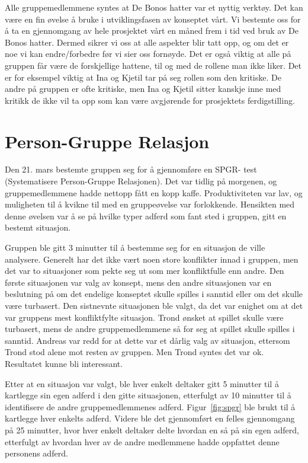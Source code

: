 Alle gruppemedlemmene syntes at De Bonos hatter var et nyttig verktøy. Det kan være en fin øvelse å bruke i utviklingsfasen av konseptet vårt. Vi bestemte oss for å ta en gjennomgang av hele prosjektet vårt en måned frem i tid ved bruk av De Bonos hatter. Dermed sikrer vi oss at alle aspekter blir tatt opp, og om det er noe vi kan endre/forbedre før vi sier oss fornøyde. Det er også viktig at alle på gruppen får være de forskjellige hattene, til og med de rollene man ikke liker. Det er for eksempel viktig at Ina og Kjetil tar på seg rollen som den kritiske. De andre på gruppen er ofte kritiske, men Ina og Kjetil sitter kanskje inne med kritikk de ikke vil ta opp som kan være avgjørende for prosjektets ferdigstilling. 


\section{Person-Gruppe Relasjon} %
Den 21. mars bestemte gruppen seg for å gjennomføre en SPGR- test (Systematisere Person-Gruppe Relasjonen). Det var tidlig på morgenen, og gruppemedlemmene hadde nettopp fått en kopp kaffe. Produktiviteten var lav, og muligheten til å kvikne til med en gruppeøvelse var forlokkende. Hensikten med denne øvelsen var å se på hvilke typer adferd som fant sted i gruppen, gitt en bestemt situasjon. 

Gruppen ble gitt 3 minutter til å bestemme seg for en situasjon de ville analysere. Generelt har det ikke vært noen store konflikter innad i gruppen, men det var to situasjoner som pekte seg ut som mer konfliktfulle enn andre. Den første situasjonen var valg av konsept, mens den andre situasjonen var en beslutning på om det endelige konseptet skulle spilles i sanntid eller om det skulle være turbasert. Den sistnevnte situasjonen ble valgt, da det var enighet om at det var gruppens mest konfliktfylte situasjon. Trond ønsket at spillet skulle være turbasert, mens de andre gruppemedlemmene så for seg at spillet skulle spilles i sanntid. Andreas var redd for at dette var et dårlig valg av situasjon, ettersom Trond stod alene mot resten av gruppen. Men Trond syntes det var ok. Resultatet kunne bli interessant.

Etter at en situasjon var valgt, ble hver enkelt deltaker gitt 5
minutter til å kartlegge sin egen adferd i den gitte situasjonen,
etterfulgt av 10 minutter til å identifisere de andre gruppemedlemmenes
adferd. Figur~\ref{fig:spgr} ble brukt til å kartlegge hver enkelts
adferd. Videre ble det gjennomført en felles gjennomgang på 25 minutter,
hvor hver enkelt deltaker delte hvordan en så på sin egen adferd,
etterfulgt av hvordan hver av de andre medlemmene hadde oppfattet denne
personens adferd.

